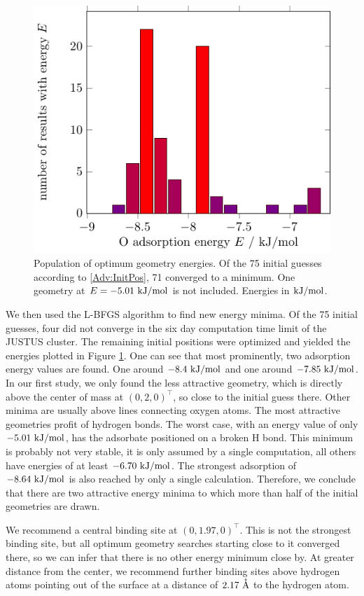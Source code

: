 \begin{figure}[b!]
\centering
\includegraphics[width=.7\textwidth]{./TikzPics/TikzCreation/BindingEnergyDistribution/BindingEnergyDistribution.pdf}
\caption{Population of optimum geometry energies. Of the 75 initial guesses
according to \eqref{Adv:InitPos}, 71 converged to a minimum. One
geometry at $E=-5.01~\text {kJ/mol}$ is not included. Energies in $\text {kJ/mol}$.}
\label{Fig:Adv:BindingSitesEnergies}
\end{figure}

We then used the L-BFGS algorithm to find new energy minima. Of the 75
initial guesses, four did not converge in the six day computation time limit
of the JUSTUS cluster. The remaining initial positions were optimized
and yielded the energies plotted in Figure \ref{Fig:Adv:BindingSitesEnergies}.
One can see that most prominently, two adsorption energy values are found. One
around $-8.4~\text {kJ/mol}$ and one around $-7.85~\text {kJ/mol}$. In our first study, we only
found the less attractive geometry, which is directly above the center of mass
at $(0,2,0)^\intercal$, so close to the initial guess there. Other minima are
usually above lines connecting oxygen atoms. The most attractive geometries
profit of hydrogen bonds. The worst case, with an energy value of only
$-5.01~\text {kJ/mol}$, has the adsorbate positioned on a broken H bond. This minimum is
probably not very stable, it is only assumed by a single computation, all
others have energies of at least $-6.70~\text {kJ/mol}$. The strongest adsorption of
$-8.64~\text {kJ/mol}$ is also reached by only a single calculation. Therefore, we
conclude that there are two attractive energy minima to which more
than half of the initial geometries are drawn.

We recommend a central binding site at $(0,1.97,0)^\intercal$. This is not the
strongest binding site, but all optimum geometry searches starting close to it
converged there, so we can infer that there is no other energy minimum close by.
At greater distance from the center, we recommend further binding sites above
hydrogen atoms pointing out of the surface at a distance of $2.17~\mathring{\text{A}}$ to the
hydrogen atom.

